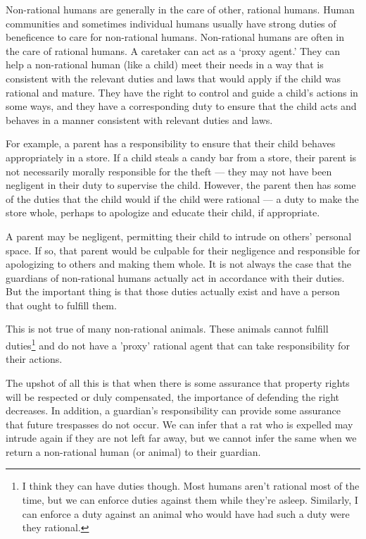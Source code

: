 		Non-rational humans are generally in the care of other, rational
		humans. Human communities and sometimes individual humans usually have
		strong duties of beneficence to care for non-rational humans.
		Non-rational humans are often in the care of rational humans. A
		caretaker can act as a ‘proxy agent.’ They can help a non-rational
		human (like a child) meet their needs in a way that is consistent with
		the relevant duties and laws that would apply if the child was rational
		and mature. They have the right to control and guide a child’s actions in
		some ways, and they have a corresponding duty to ensure that the child
		acts and behaves in a manner consistent with relevant duties and laws.

		For example, a parent has a responsibility to ensure that their child
		behaves appropriately in a store.  If a child steals a candy bar from a
		store, their parent is not necessarily morally responsible for the
		theft --- they may not have been negligent in their duty to supervise
		the child. However, the parent then has some of the duties that the
		child would if the child were rational --- a duty to make the store
		whole, perhaps to apologize and educate their child, if appropriate. 

		A parent may be negligent, permitting their child to intrude on
		others' personal space. If so, that parent would be culpable for their
		negligence and responsible for apologizing to others and making them
		whole.  It is not always the case that the guardians of non-rational
		humans actually act in accordance with their duties. But the important
		thing is that those duties actually exist and have a person that ought
		to fulfill them.

		This is not true of many non-rational animals. These animals cannot
		fulfill duties\footnote{I think they can have duties though. Most humans 
		aren't rational most of the time, but we can enforce duties against
		them while they're asleep. Similarly, I can enforce a duty against an animal
		who would have had such a duty were they rational.} and do not have
		a 'proxy' rational agent that can take responsibility for their
		actions.

		The upshot of all this is that when there is some assurance that
		property rights will be respected or duly compensated, the importance
		of defending the right decreases. In addition, a guardian's
		responsibility can provide some assurance that future trespasses do not
		occur. We can infer that a rat who is expelled may intrude again if
		they are not left far away, but we cannot infer the same when we return
		a non-rational human (or animal) to their guardian.

